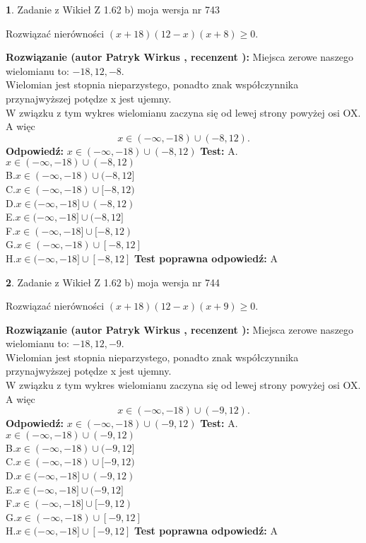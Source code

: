 \documentclass[12pt, a4paper]{article}
\theoremstyle{definition} %
\newtheorem{zad}{}
\newcommand{\zadStart}[1]{\begin{zad}#1\newline}
\newcommand{\zadStop}{\end{zad}}
\newcommand{\rozwStart}[2]{\noindent \textbf{Rozwiązanie (autor #1 , recenzent #2): }\newline}
\newcommand{\rozwStop}{\newline}
\newcommand{\odpStart}{\noindent \textbf{Odpowiedź:}\newline}
\newcommand{\odpStop}{\newline}
\newcommand{\testStart}{\noindent \textbf{Test:}\newline}
\newcommand{\testStop}{\newline}
\newcommand{\kluczStart}{\noindent \textbf{Test poprawna odpowiedź:}\newline}
\newcommand{\kluczStop}{\newline}
\begin{document}
\zadStart{Zadanie z Wikieł Z 1.62 b) moja wersja nr 743}

Rozwiązać nierówności $(x+18)(12-x)(x+8)\ge0$.
\zadStop
\rozwStart{Patryk Wirkus}{}
Miejsca zerowe naszego wielomianu to: $-18, 12, -8$.\\
Wielomian jest stopnia nieparzystego, ponadto znak współczynnika przy\linebreak najwyższej potędze x jest ujemny.\\ W związku z tym wykres wielomianu zaczyna się od lewej strony powyżej osi OX. A więc $$x \in (-\infty,-18) \cup (-8,12).$$
\rozwStop
\odpStart
$x \in (-\infty,-18) \cup (-8,12)$
\odpStop
\testStart
A.$x \in (-\infty,-18) \cup (-8,12)$\\
B.$x \in (-\infty,-18) \cup (-8,12]$\\
C.$x \in (-\infty,-18) \cup [-8,12)$\\
D.$x \in (-\infty,-18] \cup (-8,12)$\\
E.$x \in (-\infty,-18] \cup (-8,12]$\\
F.$x \in (-\infty,-18] \cup [-8,12)$\\
G.$x \in (-\infty,-18) \cup [-8,12]$\\
H.$x \in (-\infty,-18] \cup [-8,12]$
\testStop
\kluczStart
A
\kluczStop



\zadStart{Zadanie z Wikieł Z 1.62 b) moja wersja nr 744}

Rozwiązać nierówności $(x+18)(12-x)(x+9)\ge0$.
\zadStop
\rozwStart{Patryk Wirkus}{}
Miejsca zerowe naszego wielomianu to: $-18, 12, -9$.\\
Wielomian jest stopnia nieparzystego, ponadto znak współczynnika przy\linebreak najwyższej potędze x jest ujemny.\\ W związku z tym wykres wielomianu zaczyna się od lewej strony powyżej osi OX. A więc $$x \in (-\infty,-18) \cup (-9,12).$$
\rozwStop
\odpStart
$x \in (-\infty,-18) \cup (-9,12)$
\odpStop
\testStart
A.$x \in (-\infty,-18) \cup (-9,12)$\\
B.$x \in (-\infty,-18) \cup (-9,12]$\\
C.$x \in (-\infty,-18) \cup [-9,12)$\\
D.$x \in (-\infty,-18] \cup (-9,12)$\\
E.$x \in (-\infty,-18] \cup (-9,12]$\\
F.$x \in (-\infty,-18] \cup [-9,12)$\\
G.$x \in (-\infty,-18) \cup [-9,12]$\\
H.$x \in (-\infty,-18] \cup [-9,12]$
\testStop
\kluczStart
A
\kluczStop
\end{document}

